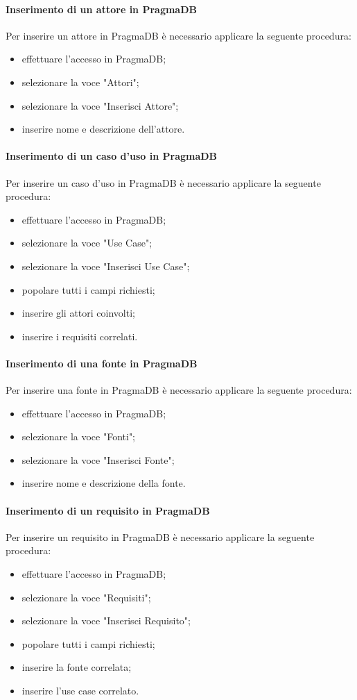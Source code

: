  \paragraph{Inserimento di un attore in PragmaDB}
 Per inserire un attore in PragmaDB è necessario applicare la seguente procedura:
 \begin{itemize}
 	\item effettuare l'accesso in PragmaDB;
 	\item selezionare la voce "Attori";
 	\item selezionare la voce "Inserisci Attore";
 	\item inserire nome e descrizione dell'attore.
 \end{itemize}
 \paragraph{Inserimento di un caso d'uso in PragmaDB}
 Per inserire un caso d'uso in PragmaDB è necessario applicare la seguente procedura:
 \begin{itemize}
 	\item effettuare l'accesso in PragmaDB;
 	\item selezionare la voce "Use Case";
 	\item selezionare la voce "Inserisci Use Case";
 	\item popolare tutti i campi richiesti;
 	\item inserire gli attori coinvolti;
 	\item inserire i requisiti correlati.
 \end{itemize}
 \paragraph{Inserimento di una fonte in PragmaDB}
 Per inserire una fonte in PragmaDB è necessario applicare la seguente procedura:
 \begin{itemize}
 	\item effettuare l'accesso in PragmaDB;
 	\item selezionare la voce "Fonti";
 	\item selezionare la voce "Inserisci Fonte";
 	\item inserire nome e descrizione della fonte.
 \end{itemize}
 \paragraph{Inserimento di un requisito in PragmaDB}
 Per inserire un requisito in PragmaDB è necessario applicare la seguente procedura:
 \begin{itemize}
 	\item effettuare l'accesso in PragmaDB;
 	\item selezionare la voce "Requisiti";
 	\item selezionare la voce "Inserisci Requisito";
 	\item popolare tutti i campi richiesti;
 	\item inserire la fonte correlata;
 	\item inserire l'use case correlato.
 \end{itemize}
